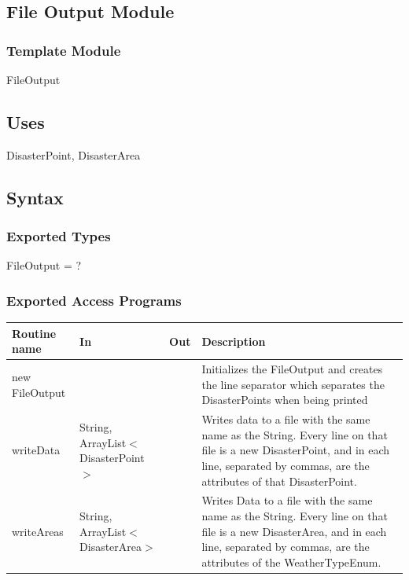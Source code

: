 \documentclass[12pt]{article}
\begin{document}
                \subsection* {File Output Module}
                
                \subsubsection*{Template Module}
                
                FileOutput
                
                \subsection* {Uses}
                
                DisasterPoint, DisasterArea
                
                \subsection* {Syntax}
                
                \subsubsection* {Exported Types}
                
                FileOutput = ?
                
                \subsubsection* {Exported Access Programs}
                
                
                \begin{tabular}{| l | l | l | p{5cm} |}
                \hline
                \textbf{Routine name} & \textbf{In} & \textbf{Out} & \textbf{Description}\\
                \hline
                new FileOutput & ~ & ~ & Initializes the FileOutput and creates the line separator which separates the DisasterPoints when being printed\\
                \hline
                writeData & String, ArrayList$<$DisasterPoint$>$ & ~ & Writes data to a file with the same name as the String. Every line on that file is a new DisasterPoint, and in each line, separated by commas, are the attributes of that DisasterPoint.\\
                \hline
                writeAreas & String, ArrayList$<$DisasterArea$>$ & ~ & Writes Data to a file with the same name as the String. Every line on that file is a new DisasterArea, and in each line, separated by commas, are the attributes of the WeatherTypeEnum.\\
                \hline
                \end{tabular}
                
\end{document}
